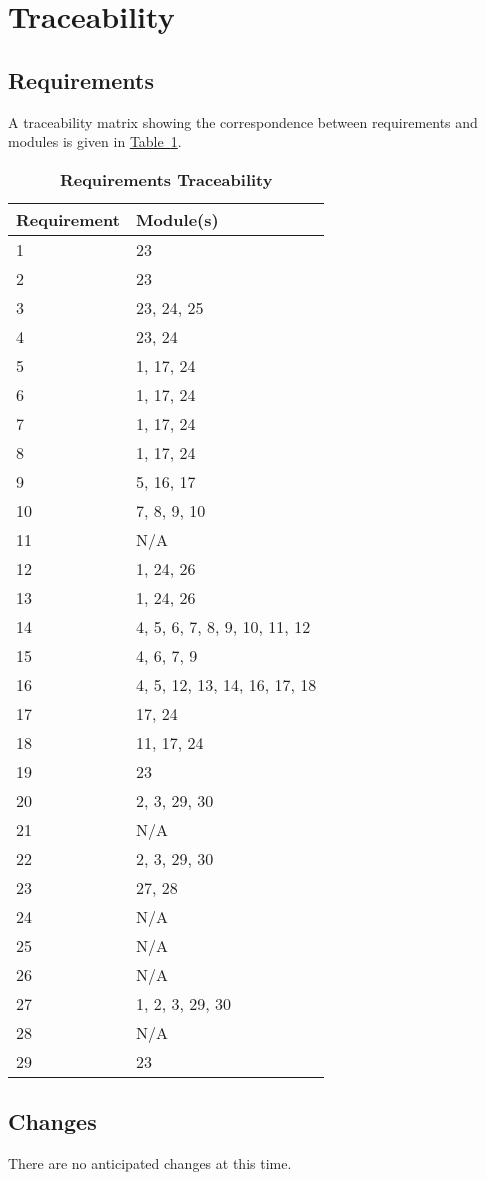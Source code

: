 \documentclass[12pt, titlepage]{article}
\begin{document}
\section{Traceability}
\subsection{Requirements}
A traceability matrix showing the correspondence between requirements and modules is given in \hyperref[tab:reqtrace]{Table~\ref*{tab:reqtrace}}.

\begin{table}[h]
\caption{\bf Requirements Traceability} \label{tab:reqtrace}
\centering
\begin{tabularx}{0.7\textwidth}{p{4cm}X}
\toprule {\bf Requirement} & {\bf Module(s)}\\
\midrule
1	&	23	\\
2	&	23	\\
3	&	23, 24, 25	\\
4	&	23, 24	\\
5	&	1, 17, 24	\\
6	&	1, 17, 24	\\
7	&	1, 17, 24	\\
8	&	1, 17, 24	\\
9	&	5, 16, 17 \\
10	&	7, 8, 9, 10	\\
11	&	N/A	\\
12	&	1, 24, 26	\\
13	&	1, 24, 26	\\
14	&	4, 5, 6, 7, 8, 9, 10, 11, 12	\\
15	&	4, 6, 7, 9	\\
16	&	4, 5, 12, 13, 14, 16, 17, 18	\\
17	&	17, 24	\\
18	&	11, 17, 24	\\
19	&	23	\\
20	&	2, 3, 29, 30	\\
21	&	N/A	\\
22	&	2, 3, 29, 30	\\
23	&	27, 28	\\
24	&	N/A	\\
25	&	N/A	\\
26	&	N/A	\\
27	&	1, 2, 3, 29, 30	\\
28  &   N/A  \\
29  &    23   \\
\bottomrule
\end{tabularx}
\end{table}

\subsection{Changes}
There are no anticipated changes at this time.
\end{document}
